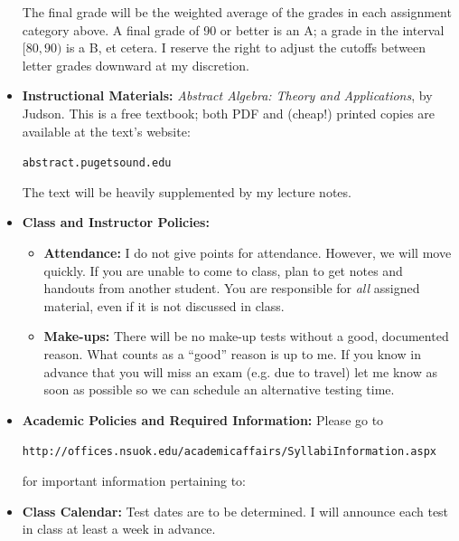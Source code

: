 \documentclass{article}
\begin{document}
\begin{itemize}
The final grade will be the weighted average of the grades in each assignment category above. A final grade of 90 or better is an A; a grade in the interval $[80,90)$ is a B, et cetera. I reserve the right to adjust the cutoffs between letter grades downward at my discretion.


\item \textbf{Instructional Materials:} \emph{Abstract Algebra: Theory and Applications}, by Judson. This is a free textbook; both PDF and (cheap!) printed copies are available at the text's website:
\begin{center}
\texttt{abstract.pugetsound.edu}
\end{center}
The text will be heavily supplemented by my lecture notes.


\item \textbf{Class and Instructor Policies:}
\begin{itemize}
\item \textbf{Attendance:} I do not give points for attendance. However, we will move quickly. If you are unable to come to class, plan to get notes and handouts from another student. You are responsible for \emph{all} assigned material, even if it is not discussed in class.

\item \textbf{Make-ups:} There will be no make-up tests without a good, documented reason. What counts as a ``good'' reason is up to me. If you know in advance that you will miss an exam (e.g. due to travel) let me know as soon as possible so we can schedule an alternative testing time.
\end{itemize}


\item \textbf{Academic Policies and Required Information:} Please go to 

\begin{center}
\texttt{http://offices.nsuok.edu/academicaffairs/SyllabiInformation.aspx}
\end{center}

for important information pertaining to:



\item \textbf{Class Calendar:} Test dates are to be determined. I will announce each test in class at least a week in advance.
\end{itemize}
\end{document}
